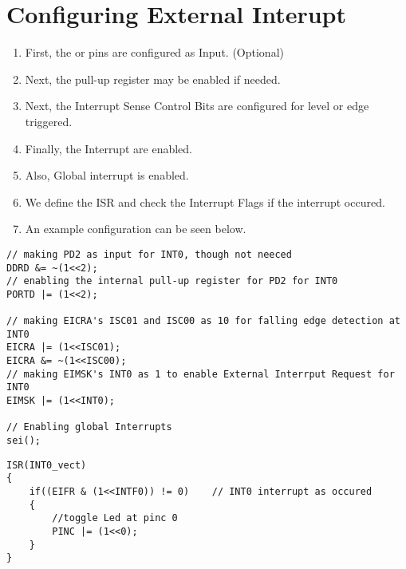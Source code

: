 \documentclass{article}
\begin{document}
\section{Configuring External Interupt}
\begin{enumerate}[label=(\Roman*)]
    \item First, the  or  pins are configured as Input. (Optional)
    \item Next, the pull-up register may be enabled if needed.
    \item Next, the Interrupt Sense Control Bits are configured for level or edge triggered.
    \item Finally, the Interrupt are enabled.
    \item Also, Global interrupt is enabled.
    \item We define the ISR and check the Interrupt Flags if the interrupt occured.
    \item An example configuration can be seen below.
\end{enumerate}

\begin{minipage}{0.5\textwidth}
\begin{verbatim}
// making PD2 as input for INT0, though not neeced
DDRD &= ~(1<<2);
// enabling the internal pull-up register for PD2 for INT0
PORTD |= (1<<2);

// making EICRA's ISC01 and ISC00 as 10 for falling edge detection at INT0
EICRA |= (1<<ISC01);
EICRA &= ~(1<<ISC00);
// making EIMSK's INT0 as 1 to enable External Interrput Request for INT0
EIMSK |= (1<<INT0);

// Enabling global Interrupts
sei();	
\end{verbatim}
\end{minipage}
\begin{minipage}{0.45\textwidth}
\begin{verbatim}
ISR(INT0_vect)
{
    if((EIFR & (1<<INTF0)) != 0)	// INT0 interrupt as occured
    {		
        //toggle Led at pinc 0
        PINC |= (1<<0);
    }
}
\end{verbatim}
\end{minipage}
\end{document}
